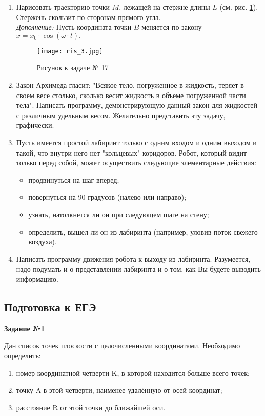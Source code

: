 \begin{enumerate}
  \item Нарисовать траекторию точки $M$, лежащей на стержне длины $L$ (см. рис. \ref{ris4}). Стержень скользит по сторонам прямого угла. \\
{\it Дополнение:} Пусть координата точки $B$  меняется по закону 
$x = x_0\cdot\cos(\omega\cdot t).$
   
\begin{figure}[!hb]
\centerline{
\texttt{[image: ris\_3.jpg]}}
\caption{Рисунок к задаче № 17}
\label{ris4}
\end{figure}
 
  \item Закон Архимеда гласит: "Всякое тело, погруженное в жидкость, теряет в своем весе столько, сколько весит жидкость в объеме погруженной части тела". 
Написать программу, демонстрирующую данный закон для жидкостей с различным удельным весом. Желательно представить эту задачу, графически.

  \item Пусть имеется простой лабиринт только с одним входом и одним выходом и такой, что внутри него нет "кольцевых" коридоров. Робот, который видит только перед собой, может осуще­ствить следующие элементарные действия:
\begin{itemize}
	\item продвинуться на шаг вперед;
	\item повернуться на 90 градусов (налево или направо);
	\item узнать, натолкнется ли он при следующем шаге на стену;
	\item определить, вышел ли он из лабиринта (например, уловив поток свежего воздуха).
\end{itemize}

  \item Написать программу движения робота к выходу из лабиринта. Разумеется, надо подумать и о представлении лабиринта и о том, как Вы будете выводить информацию.
 \end{enumerate}  



\subsection{Подготовка к ЕГЭ}

{\bf Задание №1}

Дан список точек плоскости с целочисленными координатами. Необходимо определить:

\begin{enumerate}
  \item номер координатной четверти K, в которой находится больше всего точек;
  \item точку A в этой четверти, наименее удалённую от осей координат;
  \item расстояние R от этой точки до ближайшей оси.
\end{enumerate}
  
